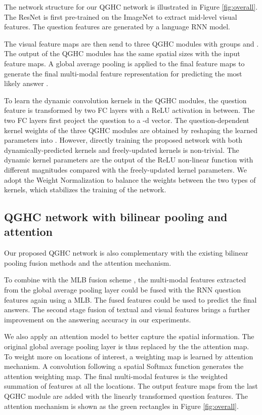 \documentclass[runningheads]{llncs}
\begin{document}
The network structure for our QGHC network is illustrated in Figure \ref{fig:overall}. The ResNet \cite{he2016deep} is first pre-trained on the ImageNet to extract mid-level visual features. The question features are generated by a language RNN model.

The visual feature maps are then send to three QGHC modules with  groups and . The output of the QGHC modules  has the same spatial sizes with the input feature maps. A global average pooling is applied to the final feature maps to generate the final multi-modal feature representation for predicting the most likely answer .

To learn the dynamic convolution kernels in the QGHC modules, the question feature  is transformed by two FC layers with a ReLU activation in between. The two FC layers first project the question to a -d vector. The  question-dependent kernel weights of the three QGHC modules are obtained by reshaping the learned parameters into . However, directly training the proposed network with both dynamically-predicted kernels and freely-updated kernels is non-trivial. The dynamic kernel parameters are the output of the ReLU non-linear function with different magnitudes compared with the freely-updated kernel parameters. We adopt the Weight Normalization \cite{salimans2016weight} to balance the weights between the two types of  kernels, which stabilizes the training of the network.


\subsection{QGHC network with bilinear pooling and attention}
\label{ssec:attention}

Our proposed QGHC network is also complementary with the existing bilinear pooling fusion methods and the attention mechanism.

To combine with the MLB fusion scheme \cite{kim2016hadamard}, the multi-modal features extracted from the global average pooling layer could be fused with the RNN question features again using a MLB. The fused features could be used to predict the final answers. The second stage fusion of textual and visual features brings a further improvement on the answering accuracy in our experiments.

We also apply an attention model to better capture the spatial information. The original global average pooling layer is thus replaced by the the attention map. 
To weight more on locations of interest, a weighting map is learned by attention mechanism. A  convolution following a spatial Softmax function generates the attention weighting map. The final multi-modal features is the weighted summation of features at all the locations. The output feature maps from the last QGHC module are added with the linearly transformed question features. The attention mechanism is shown as the green rectangles in Figure \ref{fig:overall}. 
\end{document}
